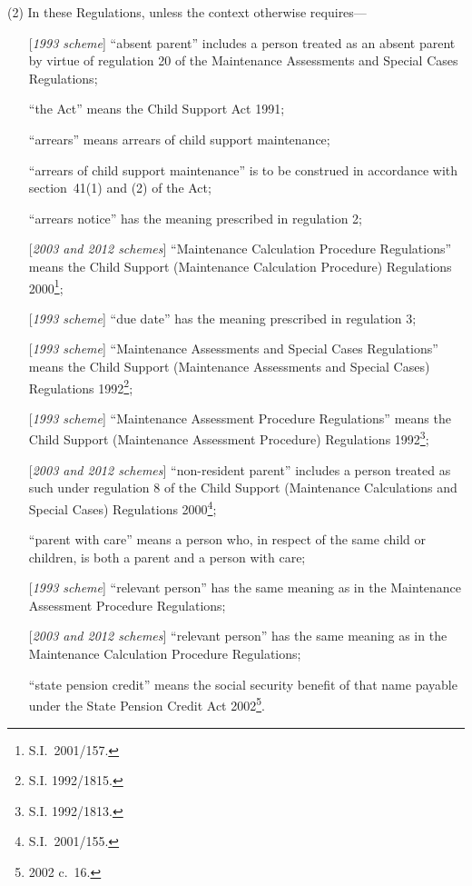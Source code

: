 \documentclass[12pt,a4paper]{article}
\begin{document}
(2) In these Regulations, unless the context otherwise requires—
\begin{enumerate}\item[]
[\emph{1993 scheme}] “absent parent” includes a person treated as an absent parent by virtue of regulation 20 of the Maintenance Assessments and Special Cases Regulations;  %

“the Act” means the Child Support Act 1991;

“arrears” means arrears of child support maintenance;

“arrears of child support maintenance” is to be construed in accordance with section~41(1) and (2) of the Act;

“arrears notice” has the meaning prescribed in regulation 2;

[\emph{2003 and 2012 schemes}] “Maintenance Calculation Procedure Regulations” means the Child Support (Maintenance Calculation Procedure) Regulations 2000\footnote{S.I.\ 2001/157.};

[\emph{1993 scheme}] “due date” has the meaning prescribed in regulation 3;  %

[\emph{1993 scheme}] “Maintenance Assessments and Special Cases Regulations” means the Child Support (Maintenance Assessments and Special Cases) Regulations 1992\footnote{\frenchspacing S.I. 1992/1815.};  %

[\emph{1993 scheme}] “Maintenance Assessment Procedure Regulations” means the Child Support (Maintenance Assessment Procedure) Regulations 1992\footnote{\frenchspacing S.I. 1992/1813.};  %

[\emph{2003 and 2012 schemes}] “non-resident parent” includes a person treated as such under regulation 8 of the Child Support (Maintenance Calculations and Special Cases) Regulations 2000\footnote{S.I.\ 2001/155.};

“parent with care” means a person who, in respect of the same child or children, is both a parent and a person with care;

[\emph{1993 scheme}] “relevant person” has the same meaning as in the Maintenance Assessment Procedure Regulations;

[\emph{2003 and 2012 schemes}] “relevant person” has the same meaning as in the 
Maintenance Calculation Procedure Regulations;  %

“state pension credit” means the social security benefit of that name payable under the State Pension Credit Act 2002\footnote{2002 c.\ 16.}.
\end{enumerate}
\end{document}

